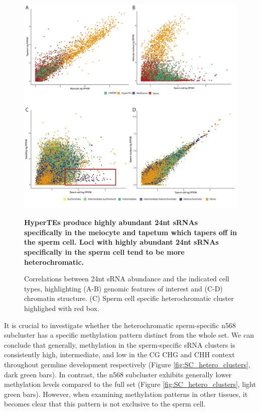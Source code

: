 \begin{figure}[htbp!] 
\centering    
    \includegraphics[width=1\textwidth]{Chapter2/Figs/Figure9_Scatterplots_HyperTEs_chromatin_SC.pdf}
\caption{\textbf{HyperTEs produce highly abundant 24nt sRNAs specifically in the meiocyte and tapetum which tapers off in the sperm cell. Loci with highly abundant 24nt sRNAs specifically in the sperm cell tend to be more heterochromatic.}}
\label{fig:scatter_SC_chromatin}
\captionsetup{font=small}
    \caption*{Correlations between 24nt sRNA abundance and the indicated cell types, highlighting (A-B) genomic features of interest and (C-D) chromatin structure. (C) Sperm cell specific heterochromatic cluster highlighed with red box. }
\end{figure}

It is crucial to investigate whether the heterochromatic sperm-specific n568 subcluster has a specific methylation pattern distinct from the whole set. We can conclude that generally, methylation in the sperm-specific sRNA clusters is consistently high, intermediate, and low in the CG CHG and CHH context throughout germline development respectively (Figure \ref{fig:SC_hetero_clusters}, dark green bars). In contrast, the n568 subcluster exhibits generally lower methylation levels compared to the full set (Figure \ref{fig:SC_hetero_clusters}, light green bars). However, when examining methylation patterns in other tissues, it becomes clear that this pattern is not exclusive to the sperm cell.

